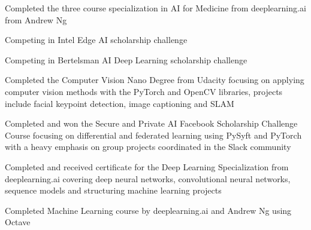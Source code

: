 \documentclass[letterpaper]{resume}
\begin{document}
\begin{compactitem}
\item Completed the three course specialization in AI for Medicine from deeplearning.ai from Andrew Ng
\item Competing in Intel Edge AI scholarship challenge
\item Competing in Bertelsman AI Deep Learning scholarship challenge
\item Completed the Computer Vision Nano Degree from Udacity focusing on applying computer vision methods with the PyTorch and OpenCV libraries, projects include facial keypoint detection, image captioning and SLAM
\item Completed and won the Secure and Private AI Facebook Scholarship Challenge Course focusing on differential and federated learning using PySyft and PyTorch with a heavy emphasis on group projects coordinated in the Slack community
\item Completed and received certificate for the Deep Learning Specialization from deeplearning.ai covering deep neural networks, convolutional neural networks, sequence models and structuring machine learning projects
\item Completed Machine Learning course by deeplearning.ai and Andrew Ng using Octave
\end{compactitem}


\end{document}
